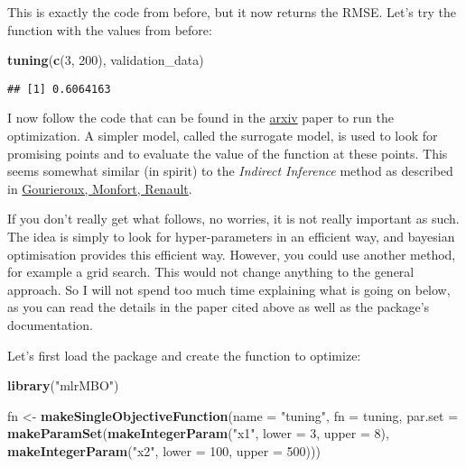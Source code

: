 \documentclass[
]{article}
\newenvironment{Shaded}{\begin{snugshade}}{\end{snugshade}}
\newcommand{\DataTypeTok}[1]{\textcolor[rgb]{0.13,0.29,0.53}{#1}}
\newcommand{\DecValTok}[1]{\textcolor[rgb]{0.00,0.00,0.81}{#1}}
\newcommand{\KeywordTok}[1]{\textcolor[rgb]{0.13,0.29,0.53}{\textbf{#1}}}
\newcommand{\NormalTok}[1]{#1}
\newcommand{\StringTok}[1]{\textcolor[rgb]{0.31,0.60,0.02}{#1}}
\begin{document}
This is exactly the code from before, but it now returns the RMSE. Let's try the function
with the values from before:

\begin{Shaded}
\begin{Highlighting}[]
\KeywordTok{tuning}\NormalTok{(}\KeywordTok{c}\NormalTok{(}\DecValTok{3}\NormalTok{, }\DecValTok{200}\NormalTok{), validation\_data)}
\end{Highlighting}
\end{Shaded}

\begin{verbatim}
## [1] 0.6064163
\end{verbatim}

I now follow the code that can be found in the \href{https://arxiv.org/abs/1703.03373}{arxiv} paper to
run the optimization. A simpler model, called the surrogate model, is used to look for promising
points and to evaluate the value of the function at these points. This seems somewhat similar
(in spirit) to the \emph{Indirect Inference} method as described in
\href{https://www.jstor.org/stable/2285076}{Gourieroux, Monfort, Renault}.

If you don't really get what follows, no worries, it is not really important as such. The idea
is simply to look for hyper-parameters in an efficient way, and bayesian optimisation provides
this efficient way. However, you could use another method, for example a grid search. This would not
change anything to the general approach. So I will not spend too much time explaining what is
going on below, as you can read the details in the paper cited above as well as the package's
documentation.

Let's first load the package and create the function to optimize:

\begin{Shaded}
\begin{Highlighting}[]
\KeywordTok{library}\NormalTok{(}\StringTok{"mlrMBO"}\NormalTok{)}
\end{Highlighting}
\end{Shaded}

\begin{Shaded}
\begin{Highlighting}[]
\NormalTok{fn \textless{}{-}}\StringTok{ }\KeywordTok{makeSingleObjectiveFunction}\NormalTok{(}\DataTypeTok{name =} \StringTok{"tuning"}\NormalTok{,}
                                 \DataTypeTok{fn =}\NormalTok{ tuning,}
                                 \DataTypeTok{par.set =} \KeywordTok{makeParamSet}\NormalTok{(}\KeywordTok{makeIntegerParam}\NormalTok{(}\StringTok{"x1"}\NormalTok{, }\DataTypeTok{lower =} \DecValTok{3}\NormalTok{, }\DataTypeTok{upper =} \DecValTok{8}\NormalTok{),}
                                                        \KeywordTok{makeIntegerParam}\NormalTok{(}\StringTok{"x2"}\NormalTok{, }\DataTypeTok{lower =} \DecValTok{100}\NormalTok{, }\DataTypeTok{upper =} \DecValTok{500}\NormalTok{)))}
\end{Highlighting}
\end{Shaded}
\end{document}
